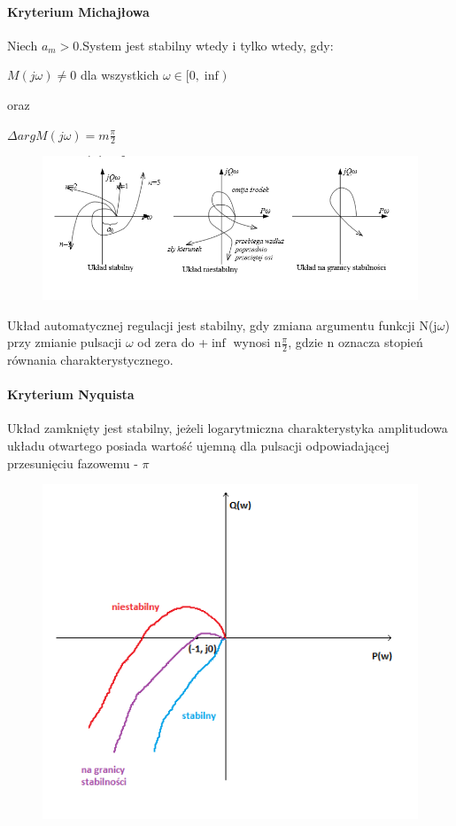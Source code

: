\documentclass[a4paper,twoside]{report}
\begin{document}
\paragraph{Kryterium Michajłowa}
Niech $ a_{m}>0$.System jest stabilny wtedy i tylko wtedy, gdy:
\begin{center}
	$ M(j\omega)\neq 0$ dla wszystkich $\omega \in [0,\inf) $ 
\end{center}
oraz
\begin{center}
	$\Delta arg M(j\omega)= m\frac{\pi}{2}  $
\end{center}
\begin{figure}[H]
	\includegraphics[scale=0.7]{obrazy/dynamiczne/Michajlow_przyklad.png}
\end{figure}
Układ automatycznej regulacji jest stabilny, gdy zmiana argumentu funkcji N(j$\omega$) przy zmianie pulsacji $\omega$
od zera do +$\inf$ wynosi n$\frac{\pi}{2}$, gdzie n oznacza stopień równania charakterystycznego.

\paragraph{Kryterium Nyquista}

Układ zamknięty jest stabilny, jeżeli logarytmiczna charakterystyka amplitudowa układu otwartego posiada wartość ujemną dla pulsacji odpowiadającej przesunięciu fazowemu - $\pi$
\begin{figure}[H]
	\includegraphics[scale=0.7]{obrazy/dynamiczne/Przyklad_nyquist.png}
\end{figure}
\end{document}
